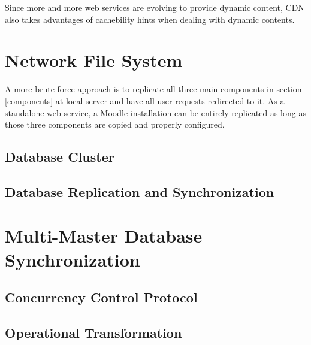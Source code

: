Since more and more web services are evolving to provide dynamic content, CDN also takes advantages of cachebility hints when dealing with dynamic contents\cite{dilley2002globally}. 



\section{Network File System}
A more brute-force approach is to replicate all three main components in section \ref{components} at local server and have all user requests redirected to it. As a standalone web service, a Moodle installation can be entirely replicated as long as those three components are copied and properly configured.

\subsection{Database Cluster}

\subsection{Database Replication and Synchronization}

\section{Multi-Master Database Synchronization}

\subsection{Concurrency Control Protocol}

\subsection{Operational Transformation}
